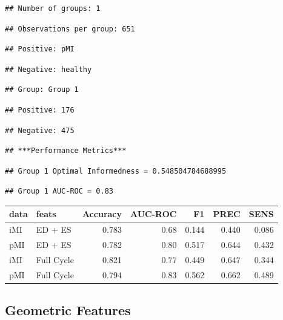 \documentclass[
]{article}
\begin{document}
\begin{verbatim}
## Number of groups: 1
\end{verbatim}

\begin{verbatim}
## Observations per group: 651
\end{verbatim}

\begin{verbatim}
## Positive: pMI
\end{verbatim}

\begin{verbatim}
## Negative: healthy
\end{verbatim}

\begin{verbatim}
## Group: Group 1
\end{verbatim}

\begin{verbatim}
## Positive: 176
\end{verbatim}

\begin{verbatim}
## Negative: 475
\end{verbatim}

\begin{verbatim}
## ***Performance Metrics***
\end{verbatim}

\begin{verbatim}
## Group 1 Optimal Informedness = 0.548504784688995
\end{verbatim}

\begin{verbatim}
## Group 1 AUC-ROC = 0.83
\end{verbatim}

\begin{tabular}{llrrrrr}
\toprule
data & feats & Accuracy & AUC-ROC & F1 & PREC & SENS\\
\midrule
iMI & ED + ES & 0.783 & 0.68 & 0.144 & 0.440 & 0.086\\
pMI & ED + ES & 0.782 & 0.80 & 0.517 & 0.644 & 0.432\\
iMI & Full Cycle & 0.821 & 0.77 & 0.449 & 0.647 & 0.344\\
pMI & Full Cycle & 0.794 & 0.83 & 0.562 & 0.662 & 0.489\\
\bottomrule
\end{tabular}

\subsection{Geometric Features}\label{geometric-features}
\end{document}
